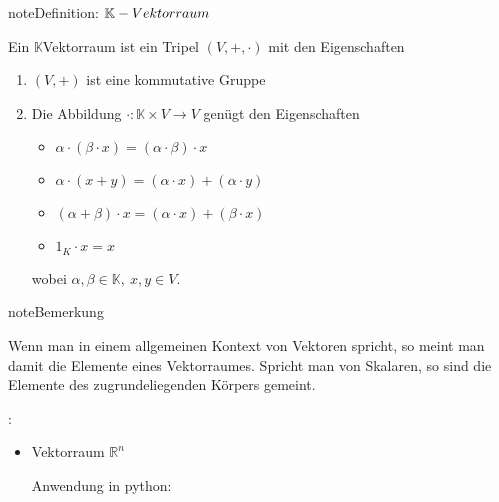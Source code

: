 \documentclass[letterpaper,10pt,english]{jupyterBook}
\begin{document}
\begin{sphinxadmonition}{note}{Definition: \protect\(\mathbb{K}-Vektorraum\protect\)}

Ein \(\mathbb{K}\)\sphinxhyphen{}Vektorraum ist ein Tripel \((V, +, \cdot)\) mit den Eigenschaften
\begin{enumerate}
%
\item {} 
\((V,+)\) ist eine kommutative Gruppe

\item {} 
Die Abbildung \(\cdot : \mathbb{K} \times V \to V\) genügt den Eigenschaften
\begin{itemize}
\item {} 
\(\alpha\cdot (\beta\cdot x) = (\alpha\cdot \beta)\cdot x\)

\item {} 
\(\alpha\cdot (x+y) = (\alpha\cdot x) + (\alpha\cdot y)\)

\item {} 
\((\alpha+\beta)\cdot x = (\alpha\cdot x) + (\beta\cdot x)\)

\item {} 
\(1_K \cdot x = x\)

\end{itemize}

wobei \(\alpha, \beta\in\mathbb{K},\ x, y\in V\).

\end{enumerate}
\end{sphinxadmonition}

\begin{sphinxadmonition}{note}{Bemerkung}

Wenn man in einem allgemeinen Kontext von Vektoren spricht, so meint man damit die Elemente eines Vektorraumes. Spricht man von Skalaren, so sind die Elemente des zugrundeliegenden Körpers gemeint.
\end{sphinxadmonition}

:
\begin{itemize}
\item {} 
Vektorraum \(\mathbb{R}^n\)

Anwendung in python:

\end{itemize}
\end{document}
